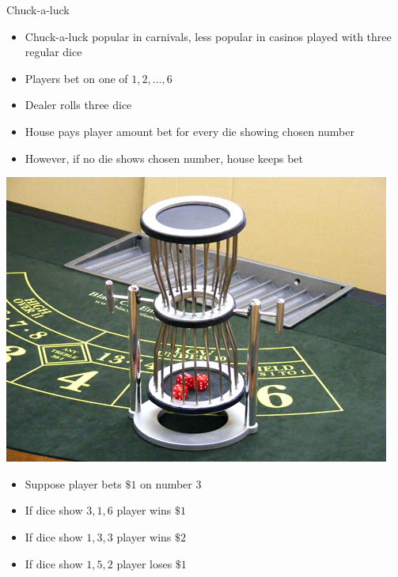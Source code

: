 \documentclass[handout]{beamer}
\theoremstyle{definition}
\begin{document}
\begin{frame}{Chuck-a-luck}
\begin{multicols}{2}
\begin{itemize}
\item Chuck-a-luck popular in carnivals, less
popular in casinos
played with three regular dice
\item Players bet on one of $1,2,\ldots,6$
\item Dealer rolls three dice
\item House pays player amount bet for every
die showing chosen number
\item However, if no die shows chosen number,
house keeps bet
\end{itemize}
\includegraphics[scale=.35]{Chuck}
\end{multicols}
\end{frame}

\begin{frame}
\begin{example}
\begin{itemize}
\item Suppose player bets $\$1$ on number $3$
\item If dice show $3,1,6$ player wins $\$1$
\item If dice show $1,3,3$ player wins $\$2$
\item If dice show $1,5,2$ player loses $\$1$
\end{itemize}
\end{example}
\end{frame}
\end{document}
